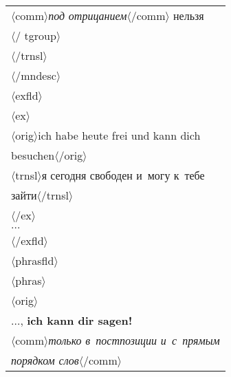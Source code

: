 \begin{multicols}{2}
{\begin{tabular}{l}
  \hspace*{12mm}$\langle${\sf comm}$\rangle$\textit{под отрицанием}$\langle$/{\sf comm}$\rangle$ 
нельзя\\
  \hspace*{10mm}$\langle$/{\sf 
tgroup}$\rangle$\\
  \hspace*{8mm}$\langle$/{\sf trnsl}$\rangle$\\
  \hspace*{6mm}$\langle$/{\sf mndesc}$\rangle$\\
  \hspace*{6mm}$\langle${\sf exfld}$\rangle$\\
  \hspace*{8mm}$\langle${\sf ex}$\rangle$\\
  \hspace*{12mm}$\langle${\sf orig}$\rangle$ich habe heute frei und kann dich\\
  \hspace*{12mm}besuchen$\langle$/{\sf orig}$\rangle$\\
  \hspace*{12mm}$\langle${\sf  trnsl}$\rangle$я сегодня свободен и~могу к~тебе\\
  \hspace*{12mm}зайти$\langle$/{\sf trnsl}$\rangle$\\
  \hspace*{8mm}$\langle$/{\sf ex}$\rangle$\\
  \hspace*{8mm}$\ldots$\\
  \hspace*{6mm}$\langle$/{\sf exfld}$\rangle$\\
  \hspace*{6mm}$\langle${\sf phrasfld}$\rangle$\\
  \hspace*{8mm}$\langle${\sf phras}$\rangle$\\
  \hspace*{10mm}$\langle${\sf orig}$\rangle$\\
  \hspace*{10mm}$\ldots$, \textbf{ich kann dir sagen!}\\ 
  \hspace*{12mm}$\langle${\sf comm}$\rangle$\textit{только в~постпозиции и~с~прямым}\\
  \hspace*{12mm}\textit{порядком  слов}$\langle$/{\sf comm}$\rangle$\\

\end{tabular}}
\end{multicols}
